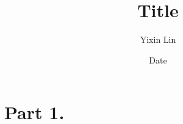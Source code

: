 \documentclass[12pt]{article}
\title{Title}
\date{Date}
\author{Yixin Lin}
\theoremstyle{plain}
\newtheorem*{theorem}{Theorem}
\begin{document}
\maketitle
\begin{mdframed}
\tableofcontents
\end{mdframed}
\newpage


\part*{Part 1.}











        



\end{document}
